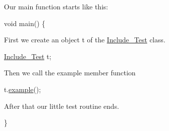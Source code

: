  Our main function starts like this\+: 
\begin{DoxyCodeInclude}
\textcolor{keywordtype}{void} main()
\{

\end{DoxyCodeInclude}
 First we create an object {\ttfamily t} of the \hyperlink{class_include___test}{Include\+\_\+\+Test} class. 
\begin{DoxyCodeInclude}
  \hyperlink{class_include___test}{Include\_Test} t;

\end{DoxyCodeInclude}
 Then we call the example member function 
\begin{DoxyCodeInclude}
  t.\hyperlink{class_include___test_aa286655e8f7f6a8ad203ef5fd8548b81}{example}();

\end{DoxyCodeInclude}
 After that our little test routine ends. 
\begin{DoxyCodeInclude}
\}

\end{DoxyCodeInclude}
 